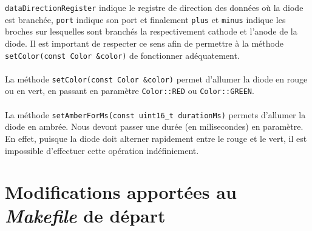 \documentclass[12pt]{scrartcl}
\begin{document}
\verb|dataDirectionRegister| indique le registre de direction des données où la
diode est branchée, \verb|port| indique son port et finalement
\verb|plus| et \verb|minus| indique les broches sur lesquelles sont branchés la
respectivement cathode et l'anode de la diode. Il est important de respecter ce
sens afin de permettre à la méthode \verb|setColor(const Color &color)| de
fonctionner adéquatement.
\\ \\
La méthode \verb|setColor(const Color &color)| permet d'allumer la diode en rouge
ou en vert, en passant en paramètre \verb|Color::RED| ou \verb|Color::GREEN|.
\\ \\
La méthode \verb|setAmberForMs(const uint16_t durationMs)| permets d'allumer la
diode en ambrée. Nous devont passer une durée (en milisecondes) en paramètre. En
effet, puisque la diode doit alterner rapidement entre le rouge et le vert, il
est impossible d'effectuer cette opération indéfiniement.
\newpage
\section{Modifications apportées au \textit{Makefile} de départ}
\end{document}
